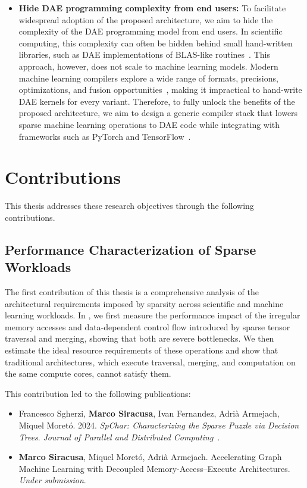 \begin{itemize}
    \item \textbf{Hide DAE programming complexity from end users:} To facilitate widespread adoption of the proposed architecture, we aim to hide the complexity of the DAE programming model from end users. In scientific computing, this complexity can often be hidden behind small hand-written libraries, such as DAE implementations of BLAS-like routines~\cite{lawson1979basic}. This approach, however, does not scale to machine learning models. Modern machine learning compilers explore a wide range of formats, precisions, optimizations, and fusion opportunities~\cite{lacouture2025fuseflow}, making it impractical to hand-write DAE kernels for every variant. Therefore, to fully unlock the benefits of the proposed architecture, we aim to design a generic compiler stack that lowers sparse machine learning operations to DAE code while integrating with frameworks such as PyTorch and TensorFlow~\cite{paszke2019neurips,abadi2015tensorflow}.
\end{itemize}

\section{Contributions} \label{sec:introduction-contributions}

This thesis addresses these research objectives through the following contributions.

\subsection{Performance Characterization of Sparse Workloads} \label{sec:introduction-performance-characterization}

The first contribution of this thesis is a comprehensive analysis of the architectural requirements imposed by sparsity across scientific and machine learning workloads. In , we first measure the performance impact of the irregular memory accesses and data-dependent control flow introduced by sparse tensor traversal and merging, showing that both are severe bottlenecks. We then estimate the ideal resource requirements of these operations and show that traditional architectures, which execute traversal, merging, and computation on the same compute cores, cannot satisfy them.

This contribution led to the following publications:
\begin{itemize}
\item Francesco Sgherzi, \textbf{Marco Siracusa}, Ivan Fernandez, Adrià Armejach, Miquel Moretó. 2024. \textit{SpChar: Characterizing the Sparse Puzzle via Decision Trees}. \textit{Journal of Parallel and Distributed Computing}~\cite{sgherzi2024jpdc}.
\item \textbf{Marco Siracusa}, Miquel Moretó, Adrià Armejach. Accelerating Graph Machine Learning with Decoupled Memory-Access--Execute Architectures. \textit{Under submission}.
\end{itemize}

